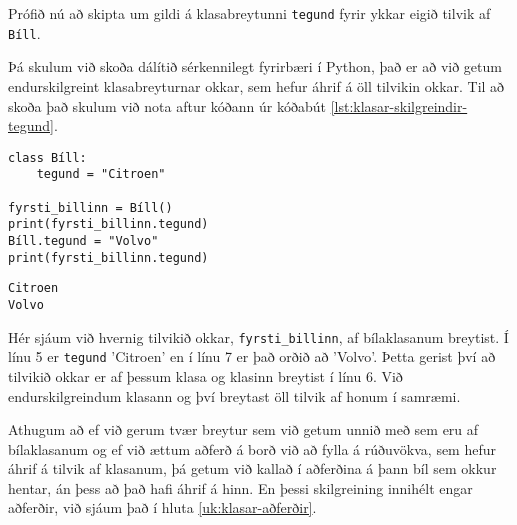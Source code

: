 Prófið nú að skipta um gildi á klasabreytunni \texttt{tegund} fyrir ykkar eigið tilvik af \texttt{Bíll}.

Þá skulum við skoða dálítið sérkennilegt fyrirbæri í Python, það er að við getum endurskilgreint klasabreyturnar okkar, sem hefur áhrif á öll tilvikin okkar.
Til að skoða það skulum við nota aftur kóðann úr kóðabút \ref{lst:klasar-skilgreindir-tegund}.

\begin{lstlisting}[caption=Endurskilgreining á því sem klasinn býður upp á, label=lst:klasar-skilgreindir-tegund2]
class Bíll:
	tegund = "Citroen"
	
fyrsti_billinn = Bíll()
print(fyrsti_billinn.tegund)
Bíll.tegund = "Volvo"
print(fyrsti_billinn.tegund)
\end{lstlisting}
\lstset{style=uttak}
\begin{lstlisting}
Citroen
Volvo
\end{lstlisting}
\lstset{style=venjulegt}

Hér sjáum við hvernig tilvikið okkar, \texttt{fyrsti\_billinn}, af bílaklasanum breytist.
Í línu 5 er \texttt{tegund} 'Citroen' en í línu 7 er það orðið að 'Volvo'.
Þetta gerist því að tilvikið okkar er af þessum klasa og klasinn breytist í línu 6.
Við endurskilgreindum klasann og því breytast öll tilvik af honum í samræmi.

Athugum að ef við gerum tvær breytur sem við getum unnið með sem eru af bílaklasanum og ef við ættum aðferð á borð við að fylla á rúðuvökva, sem hefur áhrif á tilvik af klasanum, þá getum við kallað í aðferðina á þann bíl sem okkur hentar, án þess að það hafi áhrif á hinn.
En þessi skilgreining innihélt engar aðferðir, við sjáum það í hluta  \ref{uk:klasar-aðferðir}.



